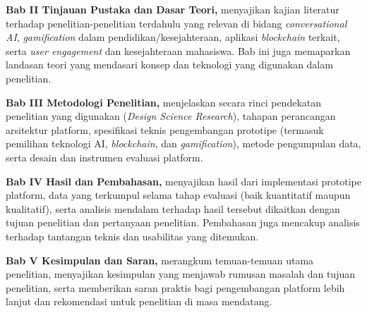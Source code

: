 \textbf{Bab II Tinjauan Pustaka dan Dasar Teori,} menyajikan kajian literatur terhadap penelitian-penelitian terdahulu yang relevan di bidang \textit{conversational AI}, \textit{gamification} dalam pendidikan/kesejahteraan, aplikasi \textit{blockchain} terkait, serta \textit{user engagement} dan kesejahteraan mahasiswa. Bab ini juga memaparkan landasan teori yang mendasari konsep dan teknologi yang digunakan dalam penelitian.

\textbf{Bab III Metodologi Penelitian,} menjelaskan secara rinci pendekatan penelitian yang digunakan (\textit{Design Science Research}), tahapan perancangan arsitektur platform, spesifikasi teknis pengembangan prototipe (termasuk pemilihan teknologi AI, \textit{blockchain}, dan \textit{gamification}), metode pengumpulan data, serta desain dan instrumen evaluasi platform.

\textbf{Bab IV Hasil dan Pembahasan,} menyajikan hasil dari implementasi prototipe platform, data yang terkumpul selama tahap evaluasi (baik kuantitatif maupun kualitatif), serta analisis mendalam terhadap hasil tersebut dikaitkan dengan tujuan penelitian dan pertanyaan penelitian. Pembahasan juga mencakup analisis terhadap tantangan teknis dan usabilitas yang ditemukan.

\textbf{Bab V Kesimpulan dan Saran,} merangkum temuan-temuan utama penelitian, menyajikan kesimpulan yang menjawab rumusan masalah dan tujuan penelitian, serta memberikan saran praktis bagi pengembangan platform lebih lanjut dan rekomendasi untuk penelitian di masa mendatang.

